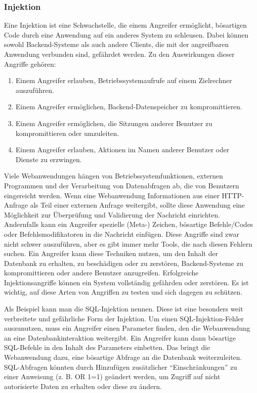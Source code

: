 \subsubsection{Injektion}

Eine Injektion ist eine Schwachstelle, die einem Angreifer ermöglicht,
bösartigen Code durch eine Anwendung auf ein anderes System zu
schleusen. Dabei können sowohl Backend-Systeme als auch andere
Clients, die mit der angreifbaren Anwendung verbunden sind, gefährdet
werden. Zu den Auswirkungen dieser Angriffe gehören:

\begin{enumerate}
    \item Einem Angreifer erlauben, Betriebssystemaufrufe auf einem
    Zielrechner auszuführen.
    \item Einem Angreifer ermöglichen, Backend-Datenspeicher
    zu kompromittieren.
    \item Einem Angreifer ermöglichen, die Sitzungen anderer
    Benutzer zu kompromittieren oder umzuleiten.
    \item Einem Angreifer erlauben, Aktionen im Namen anderer
    Benutzer oder Dienste zu erzwingen.
\end{enumerate}

Viele Webanwendungen hängen von Betriebssystemfunktionen, externen
Programmen und der Verarbeitung von Datenabfragen ab, die von
Benutzern eingereicht werden. Wenn eine Webanwendung Informationen
aus einer HTTP-Anfrage als Teil einer externen Anfrage weitergibt,
sollte diese Anwendung eine Möglichkeit zur Überprüfung und Validierung der
Nachricht einrichten. Andernfalls kann ein Angreifer spezielle
(Meta-) Zeichen, bösartige Befehle/Codes oder Befehlsmodifikatoren in
die Nachricht einfügen. Diese Angriffe sind zwar nicht schwer
auszuführen, aber es gibt immer mehr Tools, die nach diesen
Fehlern suchen. Ein Angreifer kann diese Techniken nutzen, um den
Inhalt der Datenbank zu erhalten, zu beschädigen oder zu zerstören,
Backend-Systeme zu kompromittieren oder andere Benutzer anzugreifen.
Erfolgreiche Injektionsangriffe können ein System vollständig
gefährden oder zerstören. Es ist wichtig, auf diese Arten von
Angriffen zu testen und sich dagegen zu schützen.

Als Beispiel kann man die SQL-Injektion nennen. Diese ist eine
besonders weit verbreitete und gefährliche Form der Injektion.
Um einen SQL-Injektion-Fehler auszunutzen, muss ein Angreifer
einen Parameter finden, den die Webanwendung an eine
Datenbankinteraktion weitergibt. Ein Angreifer kann dann
bösartige SQL-Befehle in den Inhalt des Parameters einbetten.
Das bringt die Webanwendung dazu, eine bösartige Abfrage an die
Datenbank weiterzuleiten. SQL-Abfragen könnten durch Hinzufügen
zusätzlicher ``Einschränkungen'' zu einer Anweisung (z. B. OR 1=1)
geändert werden, um Zugriff auf nicht autorisierte Daten zu
erhalten oder diese zu ändern.


